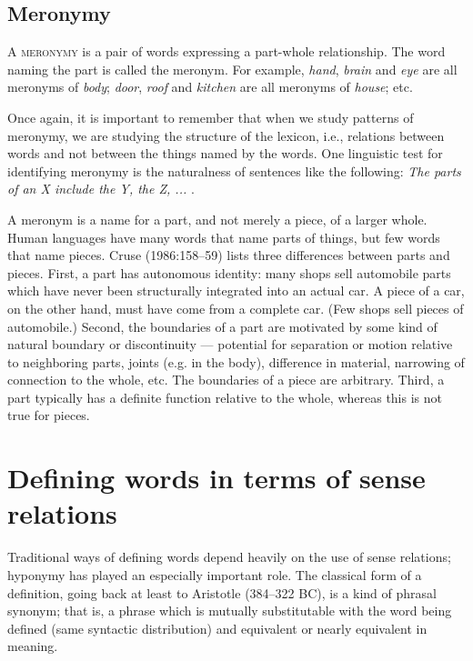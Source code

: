 \subsection{Meronymy}\label{sec:6.2.4}

A \textsc{meronymy} is a pair of words expressing a part-whole relationship. The word naming the part is called the meronym. For example, \textit{hand}, \textit{brain} and \textit{eye} are all meronyms of \textit{body}; \textit{door}, \textit{roof} and \textit{kitchen} are all meronyms of \textit{house}; etc.



Once again, it is important to remember that when we study patterns of meronymy, we are studying the structure of the lexicon, i.e., relations between words and not between the things named by the words. One linguistic test for identifying meronymy is the naturalness of sentences like the following: \textit{The parts of an X include the Y, the Z, ...} \citep[161]{Cruse1986}.



A meronym is a name for a part, and not merely a piece, of a larger whole. Human languages have many words that name parts of things, but few words that name pieces. Cruse (1986:158–59) lists three differences between parts and pieces. First, a part has autonomous identity: many shops sell automobile parts which have never been structurally integrated into an actual car. A piece of a car, on the other hand, must have come from a complete car. (Few shops sell pieces of automobile.) Second, the boundaries of a part are motivated by some kind of natural boundary or discontinuity — potential for separation or motion relative to neighboring parts, joints (e.g. in the body), difference in material, narrowing of connection to the whole, etc. The boundaries of a piece are arbitrary. Third, a part typically has a definite function relative to the whole, whereas this is not true for pieces.


\section{Defining words in terms of sense relations}\label{sec:6.3}

Traditional ways of defining words depend heavily on the use of sense relations; hyponymy has played an especially important role. The classical form of a definition, going back at least to Aristotle (384–322 BC), is a kind of phrasal synonym; that is, a phrase which is mutually substitutable with the word being defined (same syntactic distribution) and equivalent or nearly equivalent in meaning.



